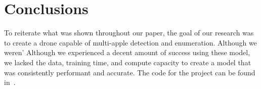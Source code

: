 \section{Conclusions}
To reiterate what was shown throughout our paper, the goal of our research was to create a drone capable of multi-apple detection and enumeration.
Although we weren'
Although we experienced a decent amount of success using these model, we lacked the data, training time, and compute capacity to create a model that was consistently performant and accurate.
The code for the project can be found in~\cite{FruitFly}.
